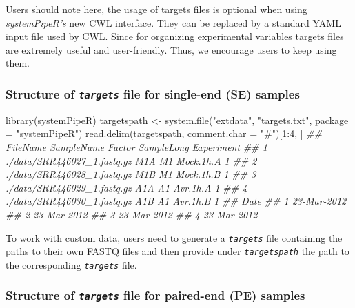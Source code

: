 \documentclass[14pt,]{article}
\newcommand{\hlnum}[1]{\textcolor[rgb]{0.816,0.125,0.439}{#1}}%
\newcommand{\hlstr}[1]{\textcolor[rgb]{0.251,0.627,0.251}{#1}}%
\newcommand{\hlcom}[1]{\textcolor[rgb]{0.502,0.502,0.502}{\textit{#1}}}%
\newcommand{\hlstd}[1]{\textcolor[rgb]{0.251,0.251,0.251}{#1}}%
\newenvironment{Shaded}{\begin{myshaded}}{\end{myshaded}}
\newcommand{\DecValTok}[1]{\hlnum{#1}}
\newcommand{\SpecialCharTok}[1]{\hlstr{#1}}
\newcommand{\StringTok}[1]{\hlstr{#1}}
\newcommand{\DocumentationTok}[1]{\hlcom{#1}}
\newcommand{\OtherTok}[1]{{#1}}
\newcommand{\FunctionTok}[1]{\hlstd{#1}}
\newcommand{\AttributeTok}[1]{{#1}}
\newcommand{\NormalTok}[1]{\hlstd{#1}}
\begin{document}
Users should note here, the usage of targets files is optional when using
\emph{systemPipeR's} new CWL interface. They can be replaced by a standard YAML
input file used by CWL. Since for organizing experimental variables targets
files are extremely useful and user-friendly. Thus, we encourage users to keep using
them.

\hypertarget{structure-of-targets-file-for-single-end-se-samples}{%
\subsubsection{\texorpdfstring{Structure of \emph{\texttt{targets}} file for single-end (SE) samples}{Structure of targets file for single-end (SE) samples}}\label{structure-of-targets-file-for-single-end-se-samples}}

\begin{Shaded}
\begin{Highlighting}[]
\FunctionTok{library}\NormalTok{(systemPipeR)}
\NormalTok{targetspath }\OtherTok{\textless{}{-}} \FunctionTok{system.file}\NormalTok{(}\StringTok{"extdata"}\NormalTok{, }\StringTok{"targets.txt"}\NormalTok{, }\AttributeTok{package =} \StringTok{"systemPipeR"}\NormalTok{)}
\FunctionTok{read.delim}\NormalTok{(targetspath, }\AttributeTok{comment.char =} \StringTok{"\#"}\NormalTok{)[}\DecValTok{1}\SpecialCharTok{:}\DecValTok{4}\NormalTok{, ]}
\DocumentationTok{\#\#                      FileName SampleName Factor SampleLong Experiment}
\DocumentationTok{\#\# 1 ./data/SRR446027\_1.fastq.gz        M1A     M1  Mock.1h.A          1}
\DocumentationTok{\#\# 2 ./data/SRR446028\_1.fastq.gz        M1B     M1  Mock.1h.B          1}
\DocumentationTok{\#\# 3 ./data/SRR446029\_1.fastq.gz        A1A     A1   Avr.1h.A          1}
\DocumentationTok{\#\# 4 ./data/SRR446030\_1.fastq.gz        A1B     A1   Avr.1h.B          1}
\DocumentationTok{\#\#          Date}
\DocumentationTok{\#\# 1 23{-}Mar{-}2012}
\DocumentationTok{\#\# 2 23{-}Mar{-}2012}
\DocumentationTok{\#\# 3 23{-}Mar{-}2012}
\DocumentationTok{\#\# 4 23{-}Mar{-}2012}
\end{Highlighting}
\end{Shaded}

To work with custom data, users need to generate a \emph{\texttt{targets}} file containing
the paths to their own FASTQ files and then provide under \emph{\texttt{targetspath}} the
path to the corresponding \emph{\texttt{targets}} file.

\hypertarget{structure-of-targets-file-for-paired-end-pe-samples}{%
\subsubsection{\texorpdfstring{Structure of \emph{\texttt{targets}} file for paired-end (PE) samples}{Structure of targets file for paired-end (PE) samples}}\label{structure-of-targets-file-for-paired-end-pe-samples}}
\end{document}

